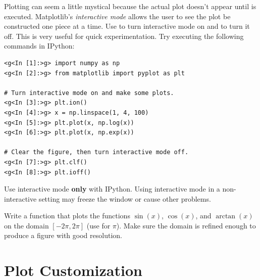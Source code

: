 \begin{info} %
Plotting can seem a little mystical because the actual plot doesn't appear until  is executed.
Matplotlib's \emph{interactive mode} allows the user to see the plot be constructed one piece at a time.
Use  to turn interactive mode on and  to turn it off.
This is very useful for quick experimentation.
Try executing the following commands in IPython:

\begin{lstlisting}
<g<In [1]:>g> import numpy as np
<g<In [2]:>g> from matplotlib import pyplot as plt

# Turn interactive mode on and make some plots.
<g<In [3]:>g> plt.ion()
<g<In [4]:>g> x = np.linspace(1, 4, 100)
<g<In [5]:>g> plt.plot(x, np.log(x))
<g<In [6]:>g> plt.plot(x, np.exp(x))

# Clear the figure, then turn interactive mode off.
<g<In [7]:>g> plt.clf()
<g<In [8]:>g> plt.ioff()
\end{lstlisting}

Use interactive mode \textbf{only} with IPython.
Using interactive mode in a non-interactive setting may freeze the window or cause other problems.
\end{info}

\begin{problem} %
Write a function that plots the functions $\sin(x)$, $\cos(x)$, and $\arctan(x)$ on the domain $[-2\pi, 2\pi]$ (use  for $\pi$).
Make sure the domain is refined enough to produce a figure with good resolution.
\end{problem}

\section*{Plot Customization} %

